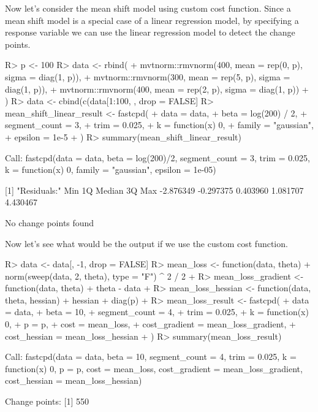 \documentclass[article]{jss}
\begin{document}
Now let's consider the mean shift model using custom cost function. Since a
mean shift model is a special case of a linear regression model, by specifying a
response variable we can use the linear regression model to detect the change
points.
%
\begin{Schunk}
\begin{Sinput}
R> p <- 100
R> data <- rbind(
+    mvtnorm::rmvnorm(400, mean = rep(0, p), sigma = diag(1, p)),
+    mvtnorm::rmvnorm(300, mean = rep(5, p), sigma = diag(1, p)),
+    mvtnorm::rmvnorm(400, mean = rep(2, p), sigma = diag(1, p))
+  )
R> data <- cbind(c(data[1:100, , drop = FALSE] %*% colMeans(data[1:100, , drop = FALSE]), data[101:200, , drop = FALSE] %*% colMeans(data[101:200, , drop = FALSE])), data)
R> mean_shift_linear_result <- fastcpd(
+    data = data,
+    beta = log(200) / 2,
+    segment_count = 3,
+    trim = 0.025,
+    k = function(x) 0,
+    family = "gaussian",
+    epsilon = 1e-5
+  )
R> summary(mean_shift_linear_result)
\end{Sinput}
\begin{Soutput}
Call:
fastcpd(data = data, beta = log(200)/2, segment_count = 3, trim = 0.025, 
    k = function(x) 0, family = "gaussian", epsilon = 1e-05)

[1] "Residuals:"
      Min        1Q    Median        3Q       Max 
-2.876349 -0.297375  0.403960  1.081707  4.430467 

No change points found
\end{Soutput}
\end{Schunk}
%
Now let's see what would be the output if we use the custom cost function.
%
\begin{Schunk}
\begin{Sinput}
R> data <- data[, -1, drop = FALSE]
R> mean_loss <- function(data, theta) {
+    norm(sweep(data, 2, theta), type = "F") ^ 2 / 2
+  }
R> mean_loss_gradient <- function(data, theta) {
+    theta - data
+  }
R> mean_loss_hessian <- function(data, theta, hessian) {
+    hessian + diag(p)
+  }
R> mean_loss_result <- fastcpd(
+    data = data,
+    beta = 10,
+    segment_count = 4,
+    trim = 0.025,
+    k = function(x) 0,
+    p = p,
+    cost = mean_loss,
+    cost_gradient = mean_loss_gradient,
+    cost_hessian = mean_loss_hessian
+  )
R> summary(mean_loss_result)
\end{Sinput}
\begin{Soutput}
Call:
fastcpd(data = data, beta = 10, segment_count = 4, trim = 0.025, 
    k = function(x) 0, p = p, cost = mean_loss, cost_gradient = mean_loss_gradient, 
    cost_hessian = mean_loss_hessian)

Change points:
[1] 550
\end{Soutput}
\end{Schunk}
\end{document}
